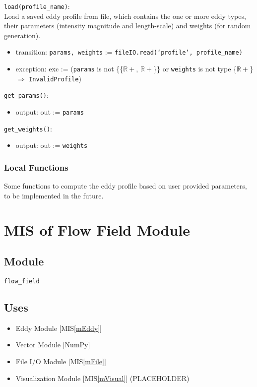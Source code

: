 \documentclass[12pt, titlepage]{article}
\begin{document}
\noindent \texttt{load(profile\_name)}:\\
Load a saved eddy profile from file, which contains the one or more eddy types, their parameters (intensity magnitude and length-scale) and weights (for random generation).
\begin{itemize}
\item transition: \texttt{params, weights} := \texttt{fileIO.read(`profile', profile\_name)}
\item exception: exc := (\texttt{params} is not \{{\{$\mathbb{R+}$, $\mathbb{R+}$\}}\} or \texttt{weights} is not type \{$\mathbb{R+}$\} $\Rightarrow$ \texttt{InvalidProfile})
\end{itemize}

\noindent \texttt{get\_params()}:
\begin{itemize}
\item output: out := \texttt{params}
\end{itemize}

\noindent \texttt{get\_weights()}:
\begin{itemize}
\item output: out := \texttt{weights}
\end{itemize}

\subsubsection{Local Functions}
Some functions to compute the eddy profile based on user provided parameters, to be implemented in the future.



\newpage
\section{MIS of Flow Field Module} \label{mFlow} 

\subsection{Module}
\texttt{flow\_field}

\subsection{Uses}
\begin{itemize}
\item Eddy Module [MIS\ref{mEddy}]
\item Vector Module [NumPy]
\item File I/O Module [MIS\ref{mFile}]
\item Visualization Module [MIS\ref{mVisual}] (PLACEHOLDER)
\end{itemize}
\end{document}

